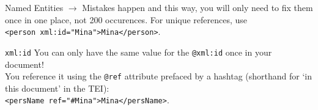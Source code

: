 \begin{frame}{Named Entities}
$\to$ Mistakes happen and this way, you will only need to fix them once in one place, not 200 occurences. 
For unique references, use  \\
\verb|<person xml:id="Mina">Mina</person>|.

\begin{block}{\texttt{xml:id}}\footnotesize
  You can only have the same value for the \texttt{@xml:id} once in your document!  \\
You reference it using the \texttt{@ref} attribute prefaced by a hashtag (shorthand for `in this document' in the TEI): \\
\verb|<persName ref="#Mina">Mina</persName>|.
\end{block}

\end{frame}

